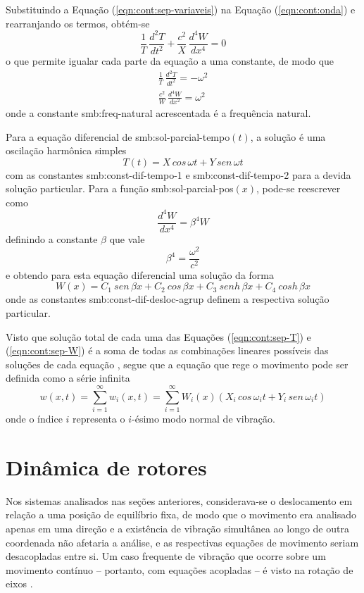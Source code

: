 \documentclass[12pt,openright,oneside,a4paper,
	chapter=TITLE,section=TITLE,
	english,brazil]{abntex2}
\begin{document}
	Substituindo a Equação (\ref{eqn:cont:sep-variaveis}) na Equação (\ref{eqn:cont:onda}) e rearranjando os termos, obtém-se 
	\begin{equation} \label{eqn:cont:geral-vigas}
		\frac{1}{T}\,\frac{d^2T}{dt^2} + \frac{c^2}{X}\,\frac{d^4W}{dx^4} = 0
	\end{equation}
	o que permite \cite{clark:1972} igualar cada parte da equação a uma constante, de modo que
	\begin{align*}
		\frac{1}{T}\,\frac{d^2T}{dt^2} = -\omega^2 \\
		\frac{c^2}{W}\,\frac{d^4W}{dx^2} = \omega^2
	\end{align*}
	onde a constante \gls{smb:freq-natural} acrescentada é a frequência natural. 
	
	Para a equação diferencial de \gls{smb:sol-parcial-tempo}$(t)$, a solução é uma oscilação harmônica simples 
	\begin{equation} \label{eqn:cont:sep-T}
		T(t) = X\,cos\,\omega t + Y\,sen\,\omega t
	\end{equation}
	com as constantes \gls{smb:const-dif-tempo-1} e \gls{smb:const-dif-tempo-2} para a devida solução particular. Para a função \gls{smb:sol-parcial-pos}$(x)$, pode-se reescrever como \[\frac{d^4W}{dx^4} = \beta^4W \] definindo a constante $\beta$ que vale \[\beta^4 = \frac{\omega^2}{c^2} \] e obtendo para esta equação diferencial uma solução da forma
	\begin{equation} \label{eqn:cont:sep-W}
		W(x) = C_1\:sen\,\beta x + C_2\:cos\,\beta x + C_3\:senh\,\beta x + C_4\:cosh\,\beta x
	\end{equation}
	onde as constantes \gls{smb:const-dif-desloc-agrup} definem a respectiva solução particular.
	
	Visto que solução total de cada uma das Equações (\ref{eqn:cont:sep-T}) e (\ref{eqn:cont:sep-W}) é a soma de todas as combinações lineares possíveis das soluções de cada equação \cite{boyce:2017}, segue que a equação que rege o movimento pode ser definida como a série infinita \cite{clark:1972}
	\begin{equation}
		w(x,t) = \sum_{i=1}^{\infty}w_i(x,t) = \sum_{i=1}^{\infty}W_i(x)(X_i\,cos\,\omega_i t + Y_i\,sen\,\omega_i t)
	\end{equation}
	onde o índice $i$ representa o $i$-ésimo modo normal de vibração.
	
	\section{Dinâmica de rotores}
	Nos sistemas analisados nas seções anteriores, considerava-se o deslocamento em relação a uma posição de equilíbrio fixa, de modo que o movimento era analisado apenas em uma direção e a existência de vibração simultânea ao longo de outra coordenada não afetaria a análise, e as respectivas equações de movimento seriam desacopladas entre si. Um caso frequente de vibração que ocorre sobre um movimento contínuo -- portanto, com equações acopladas -- é visto na rotação de eixos \cite{dimarogonas:1995}.

	\postextual
	
	
		
\end{document}
